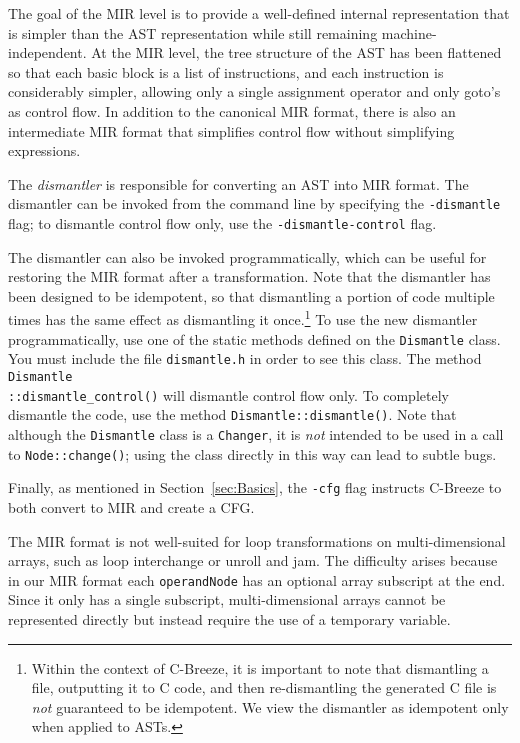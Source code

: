 The goal of the MIR level is to provide a well-defined internal
representation that is simpler than the AST representation while still
remaining machine-independent.  At the MIR level, the tree structure of the
AST has been flattened so that each basic block is a list of instructions,
and each instruction is considerably simpler, allowing only a single
assignment operator and only goto's as control flow.  In addition to the
canonical MIR format, there is also an intermediate MIR format that
simplifies control flow without simplifying expressions.

The {\em dismantler} is responsible for converting an AST into MIR format.
The dismantler can be invoked from the command line by specifying the 
\texttt{-dismantle} flag; to dismantle control flow only, use the
\texttt{-dismantle-control} flag.  

The dismantler can also be invoked programmatically, which can be useful for
restoring the MIR format after a transformation.  Note that the dismantler
has been designed to be idempotent, so that dismantling a portion of code
multiple times has the same effect as dismantling it once.\footnote{Within
the context of C-Breeze, it is important to note that dismantling a file,
outputting it to C code, and then re-dismantling the generated C file is
\emph{not} guaranteed to be idempotent.  We view the dismantler as idempotent
only when applied to ASTs.} To use the new dismantler programmatically, use
one of the static methods defined on the \texttt{Dismantle} class.  You must
include the file \texttt{dismantle.h} in order to see this class.  The method
\texttt{Dismantle\\::dismantle\_control()} will dismantle control flow only.
To completely dismantle the code, use the method
\texttt{Dismantle::dismantle()}.  Note that although the \texttt{Dismantle}
class is a \texttt{Changer}, it is \emph{not} intended to be used in a call
to \texttt{Node::change()}; using the class directly in this way can lead to
subtle bugs.

Finally, as mentioned in Section~\ref{sec:Basics}, the {\tt -cfg} flag 
instructs C-Breeze to both convert to MIR and create a CFG.

The MIR format is not well-suited for loop transformations on
multi-dimensional arrays, such as loop interchange or unroll and jam.  The
difficulty arises because in our MIR format each \texttt{operandNode} has an
optional array subscript at the end.  Since it only has a single subscript,
multi-dimensional arrays cannot be represented directly but instead require
the use of a temporary variable.



